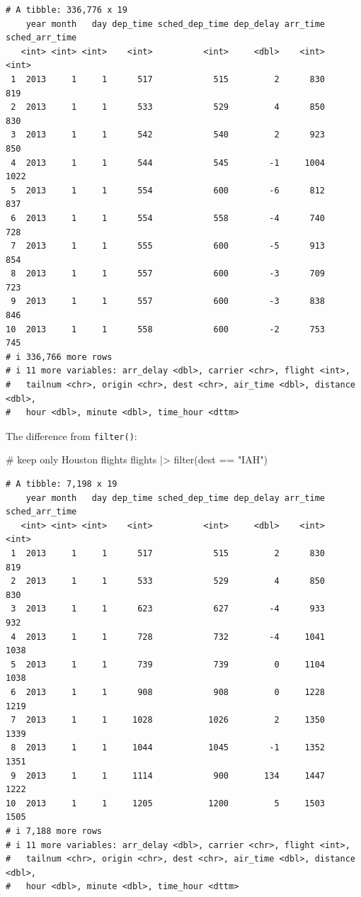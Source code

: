\documentclass[
  letterpaper,
  DIV=11,
  numbers=noendperiod]{scrreprt}
\newenvironment{Shaded}{\begin{snugshade}}{\end{snugshade}}
\newcommand{\CommentTok}[1]{\textcolor[rgb]{0.37,0.37,0.37}{#1}}
\newcommand{\FunctionTok}[1]{\textcolor[rgb]{0.28,0.35,0.67}{#1}}
\newcommand{\NormalTok}[1]{\textcolor[rgb]{0.00,0.23,0.31}{#1}}
\newcommand{\SpecialCharTok}[1]{\textcolor[rgb]{0.37,0.37,0.37}{#1}}
\newcommand{\StringTok}[1]{\textcolor[rgb]{0.13,0.47,0.30}{#1}}
\begin{document}
\begin{verbatim}
# A tibble: 336,776 x 19
    year month   day dep_time sched_dep_time dep_delay arr_time sched_arr_time
   <int> <int> <int>    <int>          <int>     <dbl>    <int>          <int>
 1  2013     1     1      517            515         2      830            819
 2  2013     1     1      533            529         4      850            830
 3  2013     1     1      542            540         2      923            850
 4  2013     1     1      544            545        -1     1004           1022
 5  2013     1     1      554            600        -6      812            837
 6  2013     1     1      554            558        -4      740            728
 7  2013     1     1      555            600        -5      913            854
 8  2013     1     1      557            600        -3      709            723
 9  2013     1     1      557            600        -3      838            846
10  2013     1     1      558            600        -2      753            745
# i 336,766 more rows
# i 11 more variables: arr_delay <dbl>, carrier <chr>, flight <int>,
#   tailnum <chr>, origin <chr>, dest <chr>, air_time <dbl>, distance <dbl>,
#   hour <dbl>, minute <dbl>, time_hour <dttm>
\end{verbatim}

The difference from \texttt{filter()}:

\begin{Shaded}
\begin{Highlighting}[]
\CommentTok{\# keep only Houston flights}
\NormalTok{flights }\SpecialCharTok{|\textgreater{}}
  \FunctionTok{filter}\NormalTok{(dest }\SpecialCharTok{==} \StringTok{"IAH"}\NormalTok{)}
\end{Highlighting}
\end{Shaded}

\begin{verbatim}
# A tibble: 7,198 x 19
    year month   day dep_time sched_dep_time dep_delay arr_time sched_arr_time
   <int> <int> <int>    <int>          <int>     <dbl>    <int>          <int>
 1  2013     1     1      517            515         2      830            819
 2  2013     1     1      533            529         4      850            830
 3  2013     1     1      623            627        -4      933            932
 4  2013     1     1      728            732        -4     1041           1038
 5  2013     1     1      739            739         0     1104           1038
 6  2013     1     1      908            908         0     1228           1219
 7  2013     1     1     1028           1026         2     1350           1339
 8  2013     1     1     1044           1045        -1     1352           1351
 9  2013     1     1     1114            900       134     1447           1222
10  2013     1     1     1205           1200         5     1503           1505
# i 7,188 more rows
# i 11 more variables: arr_delay <dbl>, carrier <chr>, flight <int>,
#   tailnum <chr>, origin <chr>, dest <chr>, air_time <dbl>, distance <dbl>,
#   hour <dbl>, minute <dbl>, time_hour <dttm>
\end{verbatim}
\end{document}
